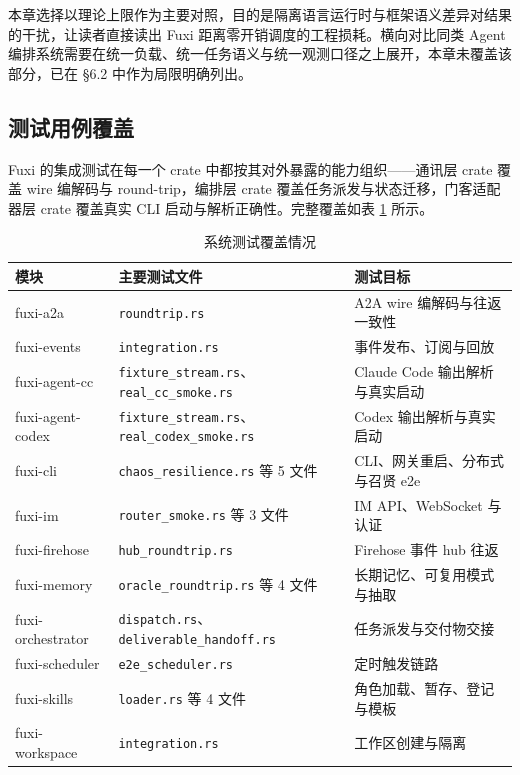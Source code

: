 本章选择以理论上限作为主要对照，目的是隔离语言运行时与框架语义差异对结果的干扰，让读者直接读出 Fuxi 距离零开销调度的工程损耗。横向对比同类 Agent 编排系统需要在统一负载、统一任务语义与统一观测口径之上展开，本章未覆盖该部分，已在 §6.2 中作为局限明确列出。

\subsection{测试用例覆盖}

Fuxi 的集成测试在每一个 crate 中都按其对外暴露的能力组织——通讯层 crate 覆盖 wire 编解码与 round-trip，编排层 crate 覆盖任务派发与状态迁移，门客适配器层 crate 覆盖真实 CLI 启动与解析正确性。完整覆盖如表 \ref{tab:test-coverage} 所示。

\begin{table}[H]
\centering
\caption{系统测试覆盖情况}
\label{tab:test-coverage}
\footnotesize
\begin{tabularx}{\textwidth}{p{2.7cm} p{6.0cm} X}
\toprule
模块 & 主要测试文件 & 测试目标 \\
\midrule
fuxi-a2a & \texttt{roundtrip.rs} & A2A wire 编解码与往返一致性 \\
fuxi-events & \texttt{integration.rs} & 事件发布、订阅与回放 \\
fuxi-agent-cc & \texttt{fixture\_stream.rs}、\texttt{real\_cc\_smoke.rs} & Claude Code 输出解析与真实启动 \\
fuxi-agent-codex & \texttt{fixture\_stream.rs}、\texttt{real\_codex\_smoke.rs} & Codex 输出解析与真实启动 \\
fuxi-cli & \texttt{chaos\_resilience.rs} 等 5 文件 & CLI、网关重启、分布式与召贤 e2e \\
fuxi-im & \texttt{router\_smoke.rs} 等 3 文件 & IM API、WebSocket 与认证 \\
fuxi-firehose & \texttt{hub\_roundtrip.rs} & Firehose 事件 hub 往返 \\
fuxi-memory & \texttt{oracle\_roundtrip.rs} 等 4 文件 & 长期记忆、可复用模式与抽取 \\
fuxi-orchestrator & \texttt{dispatch.rs}、\texttt{deliverable\_handoff.rs} & 任务派发与交付物交接 \\
fuxi-scheduler & \texttt{e2e\_scheduler.rs} & 定时触发链路 \\
fuxi-skills & \texttt{loader.rs} 等 4 文件 & 角色加载、暂存、登记与模板 \\
fuxi-workspace & \texttt{integration.rs} & 工作区创建与隔离 \\
\bottomrule
\end{tabularx}
\end{table}

